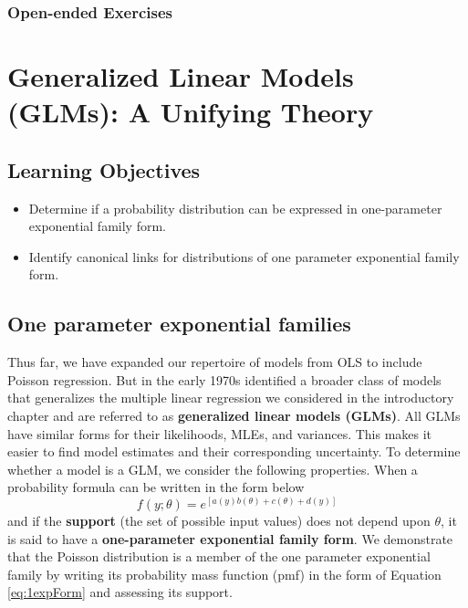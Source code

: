 \documentclass[
]{krantz}
\providecommand{\tightlist}{%
  \setlength{\itemsep}{0pt}\setlength{\parskip}{0pt}}
\begin{document}
\hypertarget{open-ended-exercises-1}{%
\subsection{Open-ended Exercises}\label{open-ended-exercises-1}}

\hypertarget{ch-glms}{%
\chapter{Generalized Linear Models (GLMs): A Unifying Theory}\label{ch-glms}}

\hypertarget{learning-objectives-4}{%
\section{Learning Objectives}\label{learning-objectives-4}}

\begin{itemize}
\tightlist
\item
  Determine if a probability distribution can be expressed in one-parameter exponential family form.
\item
  Identify canonical links for distributions of one parameter exponential family form.
\end{itemize}

\hypertarget{one-parameter-exponential-families}{%
\section{One parameter exponential families}\label{one-parameter-exponential-families}}

Thus far, we have expanded our repertoire of models from OLS to include Poisson regression. But in the early 1970s \citet{Nelder1972} identified a broader class of models that generalizes the multiple linear regression we considered in the introductory chapter and are referred to as \textbf{generalized linear models (GLMs)}. All GLMs have similar forms for their likelihoods, MLEs, and variances. This makes it easier to find model estimates and their corresponding uncertainty. To determine whether a model is a GLM, we consider the following properties.
When a probability formula can be written in the form below
\begin{equation}
f(y;\theta)=e^{[a(y)b(\theta)+c(\theta)+d(y)]}
\label{eq:1expForm}
\end{equation}
and if the \textbf{support} (the set of possible input values) does not depend upon \(\theta\), it is said to have a \textbf{one-parameter exponential family form}. We demonstrate that the Poisson distribution is a member of the one parameter exponential family by writing its probability mass function (pmf) in the form of Equation \eqref{eq:1expForm} and assessing its support.
\end{document}
